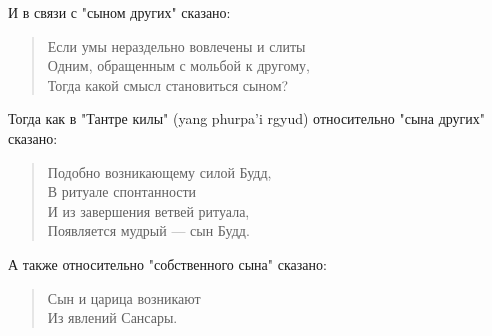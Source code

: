 \begin{siderules}
И в связи с "сыном других" сказано:

\begin{verse}
Если умы нераздельно вовлечены и слиты\\
Одним, обращенным с мольбой к другому,\\
Тогда какой смысл становиться сыном?
\end{verse}

Тогда как в "Тантре килы" (yang phurpa'i rgyud) относительно "сына других" сказано:

\begin{verse}
Подобно возникающему силой Будд,\\
В ритуале спонтанности\\
И из завершения ветвей ритуала,\\
Появляется мудрый — сын Будд.
\end{verse}

А также относительно "собственного сына" сказано:

\begin{verse}
Сын и царица возникают\\
Из явлений Сансары.\\
\end{verse}


\end{siderules}
